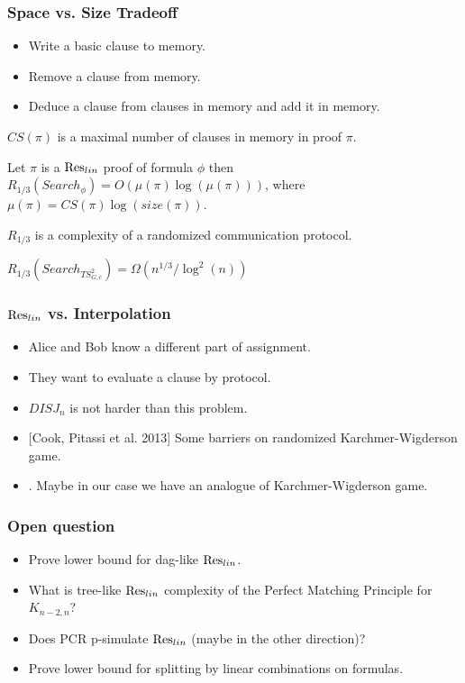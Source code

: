 \begin{frame}
    \frametitle{Space vs. Size Tradeoff}

    \pause
    \begin{itemize}
    	\item Write a basic clause to memory.
    	\item Remove a clause from memory.
    	\item Deduce a clause from clauses in memory and add it in memory.
    \end{itemize}

    \pause
    $CS(\pi)$ is a maximal number of clauses in memory in proof $\pi$.

    \pause
    \begin{theorem}
        Let $\pi$ is a $\mathrm{Res}_{lin}$ proof of formula $\phi$ then $R_{1 / 3}(Search_{\phi}) = O(\mu(\pi) \log(\mu(\pi)))$,
        where $\mu(\pi) = CS(\pi) \log(size(\pi))$.
    \end{theorem}

    $R_{1 / 3}$ is a complexity of a randomized communication protocol.
    
    \pause

    $R_{1 / 3}(Search_{TS_{G,c}^2}) = \Omega(n^{1 / 3} / \log^2(n))$
\end{frame}


\begin{frame}
    \frametitle{$\mathrm{Res}_{lin}$ vs. Interpolation}

    \begin{itemize}
        \item Alice and Bob know a different part of assignment.
    	\pause
        \item They want to evaluate a clause by  protocol.
    	\pause
        \item $DISJ_{n}$ is not harder than this problem.
    	\pause
        \item{} [Cook, Pitassi et al. 2013] Some barriers on randomized Karchmer-Wigderson game.
    	\pause
    	\item{} . Maybe in our case we have an analogue of Karchmer-Wigderson game.
	\end{itemize}
\end{frame}


\begin{frame}
    \frametitle{Open question}

    \begin{itemize}
		\item Prove lower bound for dag-like $\mathrm{Res}_{lin}$.
		\item What is tree-like $\mathrm{Res}_{lin}$ complexity of the Perfect Matching Principle for $K_{n - 2, n}$?
		\item Does PCR p-simulate $\mathrm{Res}_{lin}$ (maybe in the other direction)?
		\item Prove lower bound for splitting by linear combinations on  formulas.
	\end{itemize}
\end{frame}


